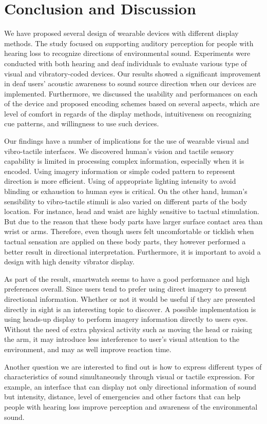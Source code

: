 \documentclass{sigchi}
\begin{document}
\section{Conclusion and Discussion}
We have proposed several design of wearable devices with different display methods. The study focused on supporting auditory perception for people with hearing loss to recognize directions of environmental sound. Experiments were conducted with both hearing and deaf individuals to evaluate various type of visual and vibratory-coded devices. Our results showed a significant improvement in deaf users' acoustic awareness to sound source direction when our devices are implemented. Furthermore, we discussed the usability and performances on each of the device and proposed encoding schemes based on several aspects, which are level of comfort in regards of the display methods, intuitiveness on recognizing cue patterns, and willingness to use such devices.

Our findings have a number of implications for the use of wearable visual and vibro-tactile interfaces. We discovered human's vision and tactile sensory capability is limited in processing complex information, especially when it is encoded. Using imagery information or simple coded pattern to represent direction is more efficient. Using of appropriate lighting intensity to avoid blinding or exhaustion to human eyes is critical. On the other hand, human's sensibility to vibro-tactile stimuli is also varied on different parts of the body location. For instance, head and waist are highly sensitive to tactual stimulation. But due to the reason that these body parts have larger surface contact area than wrist or arms. Therefore, even though users felt uncomfortable or ticklish when tactual sensation are applied on these body parts, they however performed a better result in directional interpretation. Furthermore, it is important to avoid a design with high density vibrator display.

As part of the result, smartwatch seems to have a good performance and high preferences overall. Since users tend to prefer using direct imagery to present directional information. Whether or not it would be useful if they are presented directly in sight is an interesting topic to discover. A possible implementation is using heads-up display to perform imagery information directly to users eyes. Without the need of extra physical activity such as moving the head or raising the arm, it may introduce less interference to user's visual attention to the environment, and may as well improve reaction time.

Another question we are interested to find out is how to express different types of characteristics of sound simultaneously through visual or tactile expression. For example, an interface that can display not only directional information of sound but intensity, distance, level of emergencies and other factors that can help people with hearing loss improve perception and awareness of the environmental sound.

\balance

\small


\end{document}
